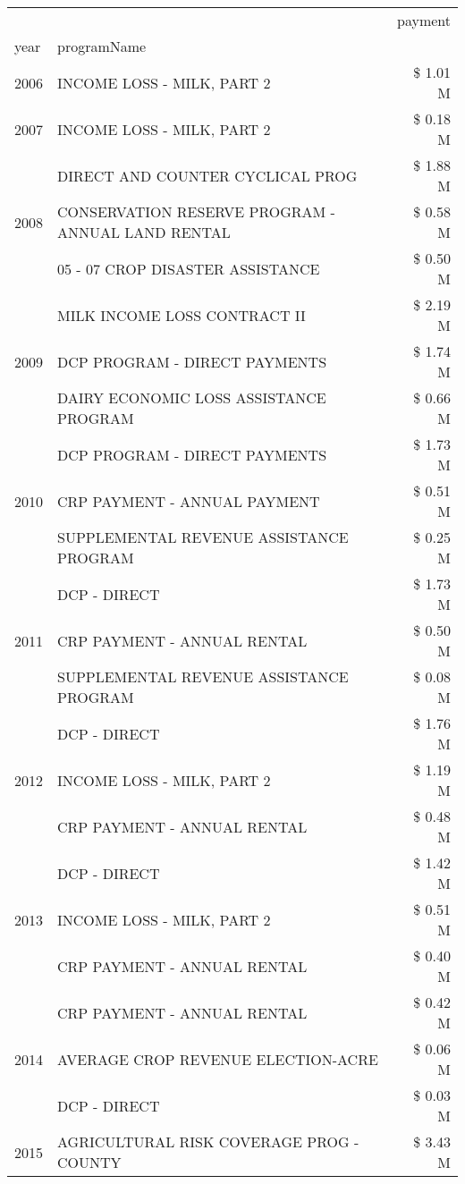 \begin{tabular}{llr}
\toprule
 &  & payment \\
year & programName &  \\
\midrule
2006 & INCOME LOSS - MILK, PART 2 & \$ 1.01 M \\
\cline{1-3}
2007 & INCOME LOSS - MILK, PART 2 & \$ 0.18 M \\
\cline{1-3}
\multirow[t]{3}{*}{2008} & DIRECT AND COUNTER CYCLICAL PROG & \$ 1.88 M \\
 & CONSERVATION RESERVE PROGRAM - ANNUAL LAND RENTAL & \$ 0.58 M \\
 & 05 - 07 CROP DISASTER ASSISTANCE & \$ 0.50 M \\
\cline{1-3}
\multirow[t]{3}{*}{2009} & MILK INCOME LOSS CONTRACT II & \$ 2.19 M \\
 & DCP PROGRAM - DIRECT PAYMENTS & \$ 1.74 M \\
 & DAIRY ECONOMIC LOSS ASSISTANCE PROGRAM & \$ 0.66 M \\
\cline{1-3}
\multirow[t]{3}{*}{2010} & DCP PROGRAM - DIRECT PAYMENTS & \$ 1.73 M \\
 & CRP PAYMENT - ANNUAL PAYMENT & \$ 0.51 M \\
 & SUPPLEMENTAL REVENUE ASSISTANCE PROGRAM & \$ 0.25 M \\
\cline{1-3}
\multirow[t]{3}{*}{2011} & DCP - DIRECT & \$ 1.73 M \\
 & CRP PAYMENT - ANNUAL RENTAL & \$ 0.50 M \\
 & SUPPLEMENTAL REVENUE ASSISTANCE PROGRAM & \$ 0.08 M \\
\cline{1-3}
\multirow[t]{3}{*}{2012} & DCP - DIRECT & \$ 1.76 M \\
 & INCOME LOSS - MILK, PART 2 & \$ 1.19 M \\
 & CRP PAYMENT - ANNUAL RENTAL & \$ 0.48 M \\
\cline{1-3}
\multirow[t]{3}{*}{2013} & DCP - DIRECT & \$ 1.42 M \\
 & INCOME LOSS - MILK, PART 2 & \$ 0.51 M \\
 & CRP PAYMENT - ANNUAL RENTAL & \$ 0.40 M \\
\cline{1-3}
\multirow[t]{3}{*}{2014} & CRP PAYMENT - ANNUAL RENTAL & \$ 0.42 M \\
 & AVERAGE CROP REVENUE ELECTION-ACRE & \$ 0.06 M \\
 & DCP - DIRECT & \$ 0.03 M \\
\cline{1-3}
\multirow[t]{3}{*}{2015} & AGRICULTURAL RISK COVERAGE PROG - COUNTY & \$ 3.43 M \\

\end{tabular}

